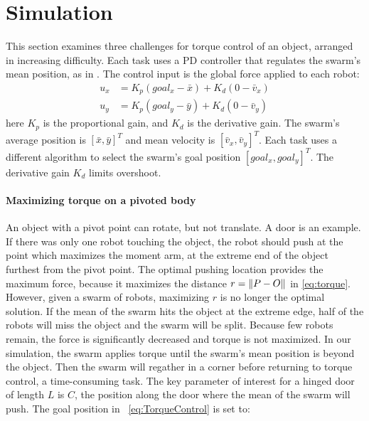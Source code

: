 
\section{Simulation}\label{sec:simulation}
This section examines three challenges for torque control of an object, arranged in increasing difficulty.  Each task uses a PD controller that regulates the swarm's mean position,  as in \cite{ShahrokhiIROS2015}. The control input is the global force applied to each robot:
\begin{align}
u_x &= K_{p}(goal_x - \bar{x}) + K_{d}(0-\bar{v}_x) \nonumber\\
u_y &= K_{p}(goal_y  - \bar{y}) + K_{d}(0-\bar{v}_y)  \label{eq:PDcontrolPosition}
\end{align}
here $K_{p}$ is the proportional gain, and $K_{d}$ is the derivative gain.  
The swarm's average position is $[\bar{x},\bar{y}]^T$ and mean velocity is $[\bar{v}_x,\bar{v}_y]^T$.  
Each task uses a different algorithm to select the swarm's goal position $[goal_x,goal_y]^T$. The derivative gain $K_d$ limits overshoot.

\paragraph{Maximizing torque on a pivoted body} \label{sec:simulationPureTorque}
An object with a pivot point can rotate, but not translate. A door is an example.
 If there was only one robot touching the object, the robot should push at the point which maximizes the moment arm, at the extreme end of the object furthest from the pivot point.
The optimal pushing location provides the maximum force, because it maximizes the distance $r = \left\lVert P - O\right\rVert$ in \eqref{eq:torque}.
However, given a swarm of robots, maximizing $r$ is no longer the optimal solution.  
If the mean of the swarm hits the object at the extreme edge, half of the robots will miss the object and  the swarm will be split.
Because few robots remain,  the force is significantly decreased and torque is not maximized.
 In our simulation, the swarm applies torque until the swarm's mean position is beyond the object. Then the swarm will regather in a corner before returning to torque control, a time-consuming task. 
 The key parameter of interest for a hinged door of length $L$ is $C$, the position along the door where the mean of the swarm will push.  The goal position in ~\eqref{eq:TorqueControl} is set to:
 
